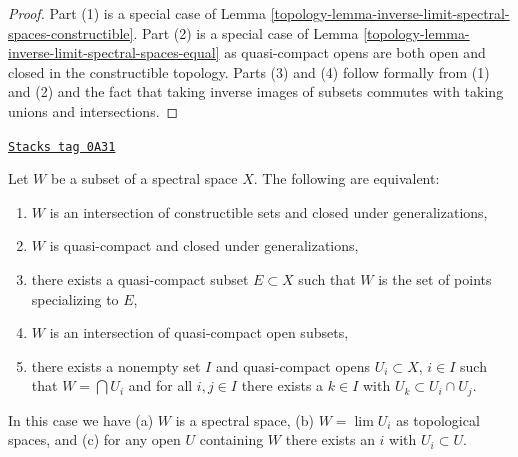 \begin{proof}

Part (1) is a special case of
Lemma \ref{topology-lemma-inverse-limit-spectral-spaces-constructible}.
Part (2) is a special case of
Lemma \ref{topology-lemma-inverse-limit-spectral-spaces-equal}
as quasi-compact opens are both open and closed in the constructible
topology. Parts (3) and (4) follow formally from (1) and (2)
and the fact that taking inverse images of subsets commutes with
taking unions and intersections.
\end{proof}

\begin{lemma}
\label{topology-lemma-make-spectral-space}
\href{https://stacks.math.columbia.edu/tag/0A31}{\texttt{Stacks tag 0A31}}

Let $W$ be a subset of a spectral space $X$. The following are equivalent:
\begin{enumerate}
\item $W$ is an intersection of constructible sets and
closed under generalizations,
\item $W$ is quasi-compact and closed under generalizations,
\item there exists a quasi-compact subset $E \subset X$ such that
$W$ is the set of points specializing to $E$,
\item $W$ is an intersection of quasi-compact open subsets,
\item
\label{topology-item-intersection-quasi-compact-open}
there exists a nonempty set $I$ and quasi-compact opens
$U_i \subset X$, $i \in I$
such that $W = \bigcap U_i$ and for all $i, j \in I$ there exists a
$k \in I$ with $U_k \subset U_i \cap U_j$.
\end{enumerate}
In this case we have (a) $W$ is a spectral space, (b) $W = \lim U_i$
as topological spaces, and (c) for any open $U$ containing $W$
there exists an $i$ with $U_i \subset U$.
\end{lemma}

